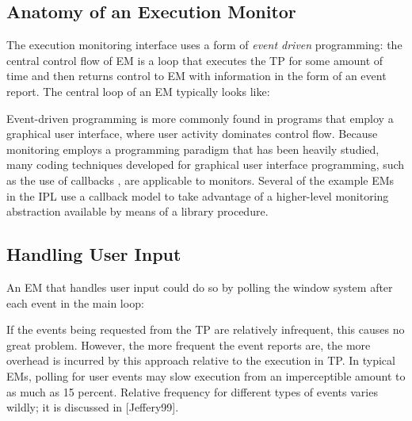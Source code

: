 \subsection*{Anatomy of an Execution Monitor}

The execution monitoring interface uses
 
a form of {\em event driven\/} programming: 
the central control flow of EM is a loop that executes the TP
for some amount of time and then returns control to EM
with information in the form of an event report.  The
central loop of an EM typically looks like:



Event-driven programming is more commonly found in programs that
employ a graphical user interface, where user activity dominates
control flow. Because monitoring employs a programming paradigm that
has been heavily studied, many coding techniques developed for
graphical user interface programming, such as the use of callbacks
\cite{Clark85}, are applicable to monitors. Several of the example EMs
in the IPL use a callback model to take advantage of a
higher-level monitoring abstraction available by means of a library
procedure.

\subsection*{Handling User Input}

An EM that handles user input could do so by polling the window system
after each event in the main loop: 


\noindent If the events being requested from the TP are relatively
infrequent, this causes no great problem.  However, the more frequent
the event reports are, the more overhead is incurred by this approach
relative to the execution in TP.  In typical EMs, polling for user
events may slow execution from an imperceptible amount to as much as 15
percent.   Relative frequency for different types of events varies
wildly; it is discussed in [Jeffery99].

